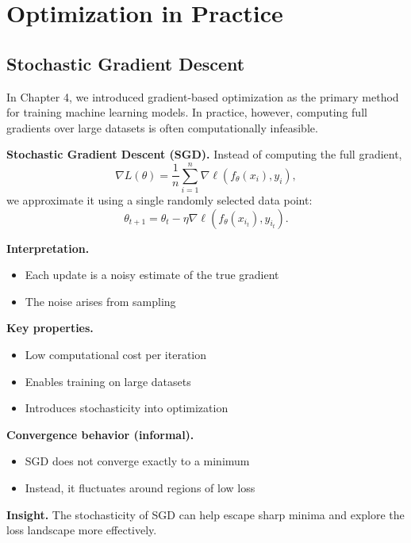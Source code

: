 \chapter{Optimization in Practice}

\section{Stochastic Gradient Descent}

In Chapter 4, we introduced gradient-based optimization as the primary method for training machine learning models. In practice, however, computing full gradients over large datasets is often computationally infeasible.

\medskip

\noindent
\textbf{Stochastic Gradient Descent (SGD).}  
Instead of computing the full gradient,
\[
\nabla L(\theta) = \frac{1}{n} \sum_{i=1}^n \nabla \ell(f_\theta(x_i), y_i),
\]
we approximate it using a single randomly selected data point:
\[
\theta_{t+1} = \theta_t - \eta \nabla \ell(f_\theta(x_{i_t}), y_{i_t}).
\]

\medskip

\noindent
\textbf{Interpretation.}
\begin{itemize}
    \item Each update is a noisy estimate of the true gradient
    \item The noise arises from sampling
\end{itemize}

\medskip

\noindent
\textbf{Key properties.}
\begin{itemize}
    \item Low computational cost per iteration
    \item Enables training on large datasets
    \item Introduces stochasticity into optimization
\end{itemize}

\medskip

\noindent
\textbf{Convergence behavior (informal).}
\begin{itemize}
    \item SGD does not converge exactly to a minimum
    \item Instead, it fluctuates around regions of low loss
\end{itemize}

\medskip

\noindent
\textbf{Insight.}  
The stochasticity of SGD can help escape sharp minima and explore the loss landscape more effectively.

